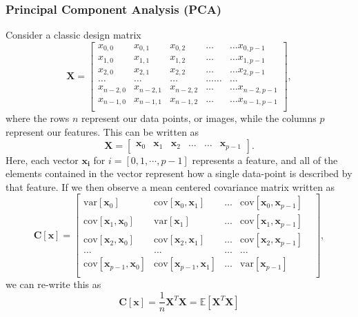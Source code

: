 \subsubsection{Principal Component Analysis (PCA)}
Consider a classic design matrix
$$
\boldsymbol{X}=\begin{bmatrix}
x_{0,0} & x_{0,1} & x_{0,2}& \dots & \dots x_{0,p-1}\\
x_{1,0} & x_{1,1} & x_{1,2}& \dots & \dots x_{1,p-1}\\
x_{2,0} & x_{2,1} & x_{2,2}& \dots & \dots x_{2,p-1}\\
\dots & \dots & \dots & \dots \dots & \dots \\
x_{n-2,0} & x_{n-2,1} & x_{n-2,2}& \dots & \dots x_{n-2,p-1}\\
x_{n-1,0} & x_{n-1,1} & x_{n-1,2}& \dots & \dots x_{n-1,p-1}\\
\end{bmatrix},
$$
where the rows $n$ represent our data points, or images, while the columns $p$ represent our features. This can be written as 
$$
\boldsymbol{X}=\begin{bmatrix} \boldsymbol{x}_0 & \boldsymbol{x}_1 & \boldsymbol{x}_2 & \dots & \dots & \boldsymbol{x}_{p-1}\end{bmatrix}.
$$
Here, each vector $\mathbf{x_i}$ for $i = [0, 1, \cdots, p-1]$ represents a feature, and all of the elements contained in the vector represent how a single data-point is described by that feature. If we then observe a mean centered covariance matrix written as 
$$
\boldsymbol{C}[\boldsymbol{x}] = \begin{bmatrix}
\mathrm{var}[\boldsymbol{x}_0] & \mathrm{cov}[\boldsymbol{x}_0,\boldsymbol{x}_1]  & \dots  & \mathrm{cov}[\boldsymbol{x}_0,\boldsymbol{x}_{p-1}]\\
\mathrm{cov}[\boldsymbol{x}_1,\boldsymbol{x}_0] & \mathrm{var}[\boldsymbol{x}_1]& \dots & \mathrm{cov}[\boldsymbol{x}_1,\boldsymbol{x}_{p-1}]\\
\mathrm{cov}[\boldsymbol{x}_2,\boldsymbol{x}_0]   & \mathrm{cov}[\boldsymbol{x}_2,\boldsymbol{x}_1] & \dots  & \mathrm{cov}[\boldsymbol{x}_2,\boldsymbol{x}_{p-1}]\\
\dots & \dots & \dots & \dots & \\
\mathrm{cov}[\boldsymbol{x}_{p-1},\boldsymbol{x}_0]   & \mathrm{cov}[\boldsymbol{x}_{p-1},\boldsymbol{x}_1]  & \dots  & \mathrm{var}[\boldsymbol{x}_{p-1}]\\
\end{bmatrix},
$$
we can re-write this as 
$$
\boldsymbol{C}[\boldsymbol{x}] = \frac{1}{n}\boldsymbol{X}^T\boldsymbol{X}= \mathbb{E}[\boldsymbol{X}^T\boldsymbol{X}]
$$
